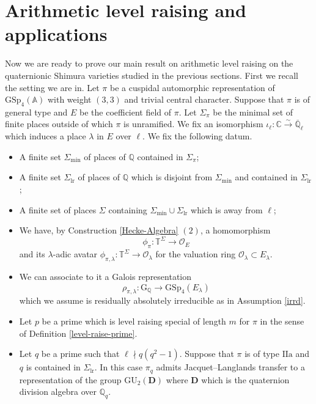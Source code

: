 \documentclass[10pt]{amsart}
\numberwithin{equation}{section}
\theoremstyle{definition}
\def\GSp{\mathrm{GSp}}
\def\GU{\mathrm{GU}}
\def\min{\mathrm{min}}
\def\lr{\mathrm{lr}}
\def\calO{\mathcal{O}}
\def\CC{\mathbb{C}}
\def\QQ{\mathbb{Q}}
\def\TT{\mathbb{T}}
\def\rma{\mathrm{a}}
\begin{document}
\section{Arithmetic level raising and applications}
Now we are ready to prove our main result on arithmetic level raising on the quaternionic Shimura varieties studied in the previous sections. First we recall the setting we are in. Let $\pi$ be a cuspidal automorphic representation of $\GSp_{4}(\mathbb{A})$ with weight $(3,3)$ and trivial central character. Suppose that $\pi$ is of general type and $E$ be the coefficient field of $\pi$. Let $\Sigma_{\pi}$ be the minimal set of finite places outside of which $\pi$ is unramified. We fix an isomorphism $\iota_{\ell}: \CC\xrightarrow{\sim}\overline{\QQ}_{\ell}$ which induces a place $\lambda$ in $E$ over $\ell$. We fix the following datum.
\begin{itemize}
\item A finite set $\Sigma_{\min}$ of places of $\QQ$ contained in $\Sigma_{\pi}$;
\item A finite set $\Sigma_{\lr}$ of places of $\QQ$ which is disjoint from $\Sigma_{\min}$ and contained in $\Sigma_{\lr}$;
\item A finite set of places $\Sigma$ containing $\Sigma_{\min}\cup\Sigma_{\lr}$ which is away from $\ell$; 
\item We have, by Construction \ref{Hecke-Algebra} $(2)$, a homomorphism
\begin{equation*}
\phi_{\pi}:\TT^{\Sigma}\rightarrow \calO_{E}
\end{equation*}
and its $\lambda$-adic avatar $\phi_{\pi, \lambda}:\TT^{\Sigma}\rightarrow \calO_{\lambda}$ for the valuation ring $\calO_{\lambda}\subset E_{\lambda}$. 
\item We can associate to it a Galois representation
\begin{equation*}
\rho_{\pi, \lambda}: \mathrm{G}_{\QQ}\rightarrow \GSp_{4}(E_{\lambda})
\end{equation*}
which we assume is residually absolutely irreducible as in Assumption \ref{irrd}.
\item Let $p$ be a prime which is level raising special of length $m$ for $\pi$ in the sense of Definition \ref{level-raise-prime}. 
\item Let $q$ be a prime such that $\ell\nmid q(q^{2}-1)$. Suppose that $\pi$ is of type $\mathrm{II}\rma$ and $q$ is contained in $\Sigma_{\lr}$. In this case $\pi_{q}$ admits Jacquet--Langlands transfer to a representation of the group $\GU_{2}(\mathbf{D})$ where $\mathbf{D}$ which is the quaternion division algebra over $\QQ_{q}$.

\end{itemize}
\end{document}
